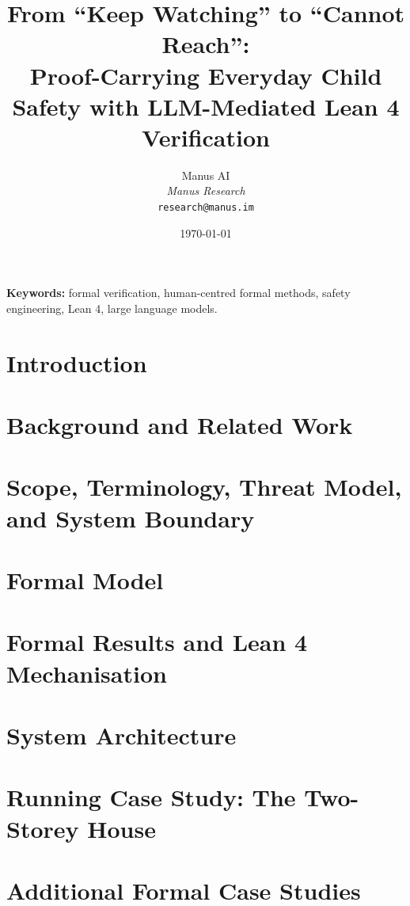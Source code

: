 \documentclass[11pt,a4paper]{article}
\title{From ``Keep Watching'' to ``Cannot Reach'': \\ Proof-Carrying Everyday Child Safety with LLM-Mediated Lean 4 Verification}
\author{Manus AI \\ \textit{Manus Research} \\ \texttt{research@manus.im}}
\date{\today}
\begin{document}
\maketitle

\begin{abstract}

\end{abstract}

\textbf{Keywords:} formal verification, human-centred formal methods, safety engineering, Lean 4, large language models.

\section{Introduction}


\section{Background and Related Work}


\section{Scope, Terminology, Threat Model, and System Boundary}


\section{Formal Model}


\section{Formal Results and Lean 4 Mechanisation}


\section{System Architecture}


\section{Running Case Study: The Two-Storey House}


\section{Additional Formal Case Studies}

\end{document}
